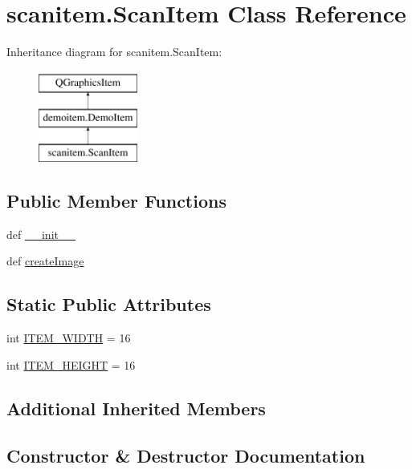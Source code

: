 \hypertarget{classscanitem_1_1ScanItem}{}\section{scanitem.\+Scan\+Item Class Reference}
\label{classscanitem_1_1ScanItem}
Inheritance diagram for scanitem.\+Scan\+Item\+:\begin{figure}[H]
\begin{center}
\leavevmode
\includegraphics[height=3.000000cm]{classscanitem_1_1ScanItem}
\end{center}
\end{figure}
\subsection*{Public Member Functions}
\begin{DoxyCompactItemize}
\item 
def \hyperlink{classscanitem_1_1ScanItem_a3b4333bcf91504b27f97100a2745470b}{\+\_\+\+\_\+init\+\_\+\+\_\+}
\item 
def \hyperlink{classscanitem_1_1ScanItem_ae0a8328722ef063b2441de7bb955b995}{create\+Image}
\end{DoxyCompactItemize}
\subsection*{Static Public Attributes}
\begin{DoxyCompactItemize}
\item 
int \hyperlink{classscanitem_1_1ScanItem_add344ae5f49482abf15b0b65263532c2}{I\+T\+E\+M\+\_\+\+W\+I\+D\+T\+H} = 16
\item 
int \hyperlink{classscanitem_1_1ScanItem_a128704eaa553b03c03c42297fb8bf056}{I\+T\+E\+M\+\_\+\+H\+E\+I\+G\+H\+T} = 16
\end{DoxyCompactItemize}
\subsection*{Additional Inherited Members}


\subsection{Constructor \& Destructor Documentation}
\hypertarget{classscanitem_1_1ScanItem_a3b4333bcf91504b27f97100a2745470b}{}
